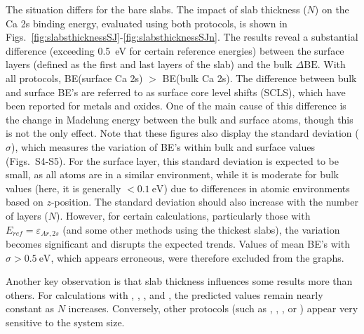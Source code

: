 \documentclass[%
aip,
amsmath,amssymb,
preprint,%
jcp,
showkeys,
]{revtex4-2}
\def\dbe{\ensuremath{\Delta\text{BE}}}
\begin{document}
The situation differs for the bare slabs. The impact of slab thickness ($N$) on the Ca 2s binding energy, evaluated using both protocols, is shown in Figs.~\ref{fig:slabsthicknessSJ}-\ref{fig:slabsthicknessSJn}. The results reveal a substantial difference (exceeding \SI{0.5}{\electronvolt} for certain reference energies) between the surface layers (defined as the first and last layers of the slab) and the bulk \dbe{}. With all protocols, BE(surface Ca 2s) $>$ BE(bulk Ca 2s). The difference between bulk and surface BE's are referred to as surface core level shifts (SCLS),\cite{olovssonCorelevelShiftsComplex2006,bagusChemicalSignificanceXray2023} which have been reported for metals\cite{aldenInitioSurfaceCorelevel1993,weinertCorelevelShiftsBulk1995,olovssonCorelevelShiftsComplex2006} and oxides\cite{harmerSpeciesFormedCuprite2009,lousadaFirstStagesOxide2018,bagusRevisitingSurfaceCorelevel2019,cristinadeoliveiraRoleSurfacesMagnetic2021,silvalucenademedeirosAMoO3MicroNanoparticles2024}. One of the main cause of this difference is the change in Madelung energy between the bulk and surface atoms\cite{nelinSurfaceCorelevelBinding2014}, though this is not the only effect\cite{bagusRevisitingSurfaceCorelevel2019,bagusChemicalSignificanceXray2023,bagusXrayPhotoelectronSpectroscopy2024}. 
Note that these figures also display the standard deviation ($\sigma$), which measures the variation of BE's within bulk and surface values (Figs.~S4-S5). For the surface layer, this standard deviation is expected to be small, as all atoms are in a similar environment, while it is moderate for bulk values (here, it is generally $<\SI{0.1}{\electronvolt}$) due to differences in atomic environments based on $z$-position. The standard deviation should also increase with the number of layers ($N$). However, for certain calculations, particularly those with $E_{ref}=\varepsilon_{Ar,2s}$ (and some other methods using the thickest slabs), the variation becomes significant and disrupts the expected trends. Values of mean BE's with $\sigma > \SI{0.5}{\electronvolt}$, which appears erroneous, were therefore excluded from the graphs.


Another key observation is that slab thickness influences some results more than others. For calculations with , , , and , the predicted values remain nearly constant as $N$ increases. Conversely, other protocols (such as , , \cpx{\phi}, or ) appear very sensitive to the system size. 
\end{document}
